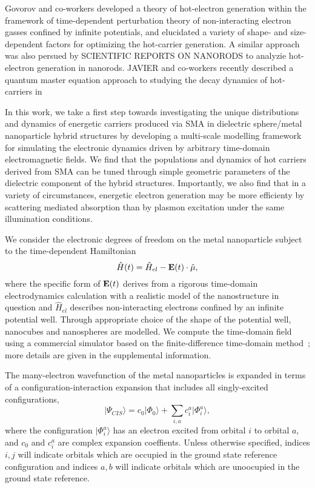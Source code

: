 \documentclass[journal=jpclcd,manuscript=letter]{achemso}
\begin{document}
Govorov and co-workers developed a theory of 
hot-electron generation within the framework of time-dependent perturbation theory of non-interacting electron gasses
confined by infinite potentials, and elucidated a variety of shape- and size-dependent factors for optimizing 
the hot-carrier generation.  A similar approach was also persued by SCIENTIFIC REPORTS ON NANORODS to analyzie hot-electron
generation in nanorods.  JAVIER and co-workers recently described a quantum master equation approach to studying the decay 
dynamics of hot-carriers in 

In this work, we take a first step towards investigating the unique distributions and dynamics of energetic carriers produced via SMA in 
dielectric sphere/metal nanoparticle hybrid structures by developing a multi-scale modelling framework
for simulating the electronic dynamics driven by arbitrary time-domain electromagnetic fields.  We find that the populations
and dynamics of hot carriers derived from SMA can be tuned through simple
geometric parameters of the dielectric component of the hybrid structures.   Importantly, we also find that in a variety of circumstances, energetic electron
generation may be more efficienty by scattering mediated absorption than by plasmon excitation under the same illumination conditions.

We consider the electronic degrees of freedom on the metal nanoparticle subject to the time-dependent Hamiltonian 
\begin{equation}\label{eq:TDHam}
\hat{H}(t) = \hat{H}_{el} - {\bf E}(t) \cdot \hat{\mu}, 
\end{equation}
where the specific form of ${\bf E}(t)$ derives from a rigorous time-domain electrodynamics calculation with a realistic model
of the nanostructure in question and $\hat{H}_{el}$ describes non-interacting electrons confined by an infinite potential well.  
Through appropriate choice of the shape of the potential well, nanocubes and nanospheres are modelled.  We compute the time-domain field 
using a commercial simulator based on the finite-difference time-domain method~\cite{Lumerical}; more details are given in 
the supplemental information.    

The many-electron wavefunction of the metal nanoparticles is expanded in terms of a configuration-interaction expansion that
includes all singly-excited configurations,
\begin{equation}\label{eq:CIS}
|\Psi_{CIS}\rangle = c_0 |\Phi_0 \rangle + \sum_{i,a} c_i^a |\Phi_i^a\rangle,
\end{equation}
where the configuration $|\Phi_i^a\rangle$ has an electron excited from orbital $i$ to orbital $a$, 
and $c_0$ and $c_i^a$ are complex expansion coeffients.  Unless otherwise specified, indices $i, j$ will indicate
orbitals which are occupied in the ground state reference configuration and indices $a, b$ will indicate orbitals
which are unoocupied in the ground state reference.  
\end{document}
